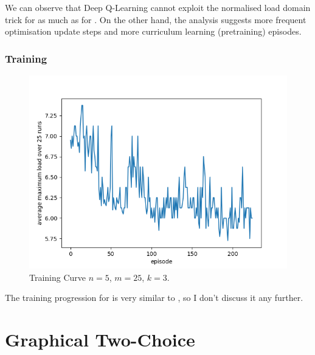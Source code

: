 We can observe that Deep Q-Learning cannot exploit the normalised load domain trick for \KThinning as much as for \TwoThinning.  On the other hand, the analysis suggests more frequent optimisation update steps and more curriculum learning (pretraining) episodes. 


\subsubsection{Training}


\begin{figure}[h] \label{k-thinning-training-curve}
    \centering
    \includegraphics[scale=0.6]{Chapter4/Figs/training_progression_5_25_3.png}
    \caption{\KThinning Training Curve $n=5$, $m=25$, $k=3$. \protect \footnotemark }
\end{figure}



The training progression for \KThinning is very similar to \TwoThinning, so I don't discuss it any further.


\section{Graphical Two-Choice}


